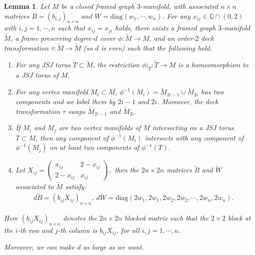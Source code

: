 \documentclass{amsart}
\numberwithin{equation}{section}
\newtheorem{lemma}[theorem]{Lemma}
\theoremstyle{definition}
\begin{document}
\begin{lemma}\label{cover}
Let $M$ be a closed framed graph $3$-manifold, with associated $n\times n$ matrices $B=(b_{i,j})_{n\times n}$ and $W=\text{diag}(w_1,\cdots,w_n)$. For any $x_{ij}\in \mathbb{Q}\cap (0,2)$ with $i,j=1,\cdots,n$ such that $x_{ij}=x_{ji}$ holds, there exists a framed graph $3$-manifold $\tilde{M}$, a frame preserving degree-$d$ cover $\phi:\tilde{M}\to M$, and  an order-$2$ deck transformation $\tau:\tilde{M}\to \tilde{M}$ (so $d$ is even) such that the following hold.
\begin{enumerate}
\item For any JSJ torus $\tilde{T}\subset \tilde{M}$, the restriction $\phi|_{\tilde{T}}:\tilde{T}\to M$ is a homeomorphism to a JSJ torus of $M$.
\item For any vertex manifold $M_i\subset M$, $\phi^{-1}(M_i)=\tilde{M}_{2i-1}\cup \tilde{M}_{2i}$ has two components and we label them by $2i-1$ and $2i$. Moreover, the deck transformation $\tau$ swaps $\tilde{M}_{2i-1}$ and $\tilde{M}_{2i}$.
\item If $M_i$ and $M_j$ are two vertex manifolds of $M$ intersecting on a JSJ torus $T\subset M$, then any component of $\phi^{-1}(M_i)$ intersects with any component of $\phi^{-1}(M_j)$ on at least two components of $\phi^{-1}(T)$.
\item Let $X_{ij}=
\begin{pmatrix}
x_{ij} & 2-x_{ij}\\
2-x_{ij} & x_{ij}
\end{pmatrix},$ then the $2n\times 2n$ matrices $\tilde{B}$ and $\tilde{W}$ associated to $\tilde{M}$ satisfy:
\begin{align}\label{5.11}
d\tilde{B}=(b_{ij}X_{ij})_{n\times n},\ d\tilde{W}=\text{diag}(2w_1,2w_1,2w_2,2w_2,\cdots,2w_n,2w_n).
\end{align}
\end{enumerate} 
Here $(b_{ij}X_{ij})_{n\times n}$ denotes the $2n\times 2n$ blocked matrix such that the $2\times 2$ block at the $i$-th row and $j$-th column is $b_{ij}X_{ij}$, for all $i,j=1,\cdots,n$.

Moreover, we can make $d$ as large as we want.
\end{lemma}
\end{document}

